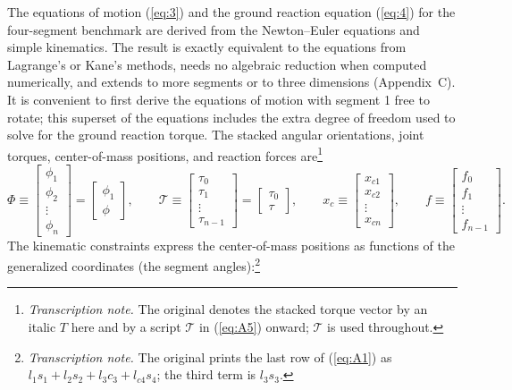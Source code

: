 \documentclass[11pt]{article}
\newcommand{\tnote}[1]{\footnote{\textit{Transcription note.} #1}}
\begin{document}
The equations of motion (\ref{eq:3}) and the ground reaction equation
(\ref{eq:4}) for the four-segment benchmark are derived from the Newton--Euler
equations and simple kinematics. The result is exactly equivalent to the
equations from Lagrange's \cite{Greenwood1988} or Kane's
\cite{KaneLevinson1985} methods, needs no algebraic reduction when computed
numerically, and extends to more segments or to three dimensions
(Appendix~C). It is convenient to first derive the equations of motion with
segment 1 free to rotate; this superset of the equations includes the extra
degree of freedom used to solve for the ground reaction torque. The stacked
angular orientations, joint torques, center-of-mass positions, and reaction
forces are\tnote{The original denotes the stacked torque vector by an italic
$T$ here and by a script $\mathcal{T}$ in (\ref{eq:A5}) onward; $\mathcal{T}$
is used throughout.}
\[
\Phi \equiv \begin{bmatrix}\phi_1\\ \phi_2\\ \vdots\\ \phi_n\end{bmatrix}
= \begin{bmatrix}\phi_1\\ \phi\end{bmatrix},
\qquad
\mathcal{T} \equiv \begin{bmatrix}\tau_0\\ \tau_1\\ \vdots\\ \tau_{n-1}
\end{bmatrix}
= \begin{bmatrix}\tau_0\\ \tau\end{bmatrix},
\qquad
x_c \equiv \begin{bmatrix}x_{c1}\\ x_{c2}\\ \vdots\\ x_{cn}\end{bmatrix},
\qquad
f \equiv \begin{bmatrix}f_0\\ f_1\\ \vdots\\ f_{n-1}\end{bmatrix}.
\]
The kinematic constraints express the center-of-mass positions as functions of
the generalized coordinates (the segment angles):\tnote{The original prints
the last row of (\ref{eq:A1}) as $l_1s_1+l_2s_2+l_3c_3+l_{c4}s_4$; the third
term is $l_3s_3$.}
\end{document}

